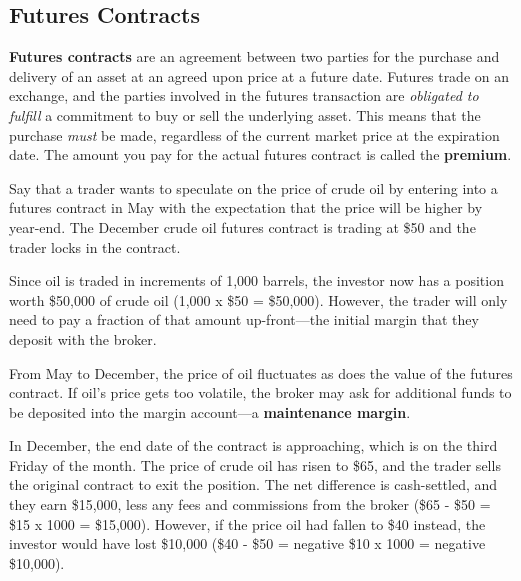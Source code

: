 \documentclass{article}
\begin{document}
  \subsection{Futures Contracts}

    \begin{definition}
      \textbf{Futures contracts} are an agreement between two parties for the purchase and delivery of an asset at an agreed upon price at a future date. Futures trade on an exchange, and the parties involved in the futures transaction are \textit{obligated to fulfill} a commitment to buy or sell the underlying asset. This means that the purchase \textit{must} be made, regardless of the current market price at the expiration date. The amount you pay for the actual futures contract is called the \textbf{premium}. 
    \end{definition}

    \begin{example}
      Say that a trader wants to speculate on the price of crude oil by entering into a futures contract in May with the expectation that the price will be higher by year-end. The December crude oil futures contract is trading at \$50 and the trader locks in the contract.

      Since oil is traded in increments of 1,000 barrels, the investor now has a position worth \$50,000 of crude oil (1,000 x \$50 = \$50,000). However, the trader will only need to pay a fraction of that amount up-front—the initial margin that they deposit with the broker. 

      From May to December, the price of oil fluctuates as does the value of the futures contract. If oil's price gets too volatile, the broker may ask for additional funds to be deposited into the margin account—a \textbf{maintenance margin}.

      In December, the end date of the contract is approaching, which is on the third Friday of the month. The price of crude oil has risen to \$65, and the trader sells the original contract to exit the position. The net difference is cash-settled, and they earn \$15,000, less any fees and commissions from the broker (\$65 - \$50 = \$15 x 1000 = \$15,000). However, if the price oil had fallen to \$40 instead, the investor would have lost \$10,000 (\$40 - \$50 = negative \$10 x 1000 = negative \$10,000).
    \end{example}
\end{document}
